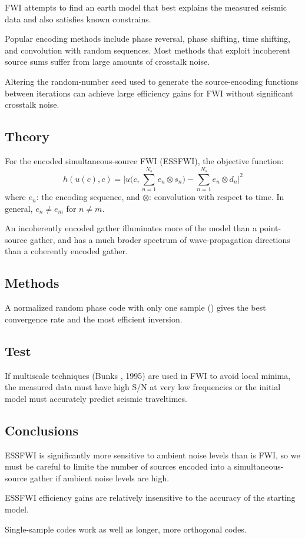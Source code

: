 FWI attempts to find an earth model that best explains
the measured seismic data and also satisfies known constrains.

Popular encoding methods include phase reversal, phase shifting, time shifting,
and convolution with random sequences.
Most methods that exploit incoherent source sums suffer from
large amounts of crosstalk noise.

Altering the random-number seed used to generate the source-encoding functions
between iterations can achieve large efficiency gains for FWI
without significant crosstalk noise.

\subsection{Theory}
For the encoded simultaneous-source FWI (ESSFWI),
the objective function:
\[ h(u(c),c) = \Bigg| u\Bigg(c,\sum_{n=1}^{N_s}e_n\otimes s_n\Bigg)
  - \sum_{n=1}^{N_s}e_n\otimes d_n\Bigg|^2 \]
where $e_n$: the encoding sequence,
and $\otimes$: convolution with respect to time.
In general, $e_n\neq e_m$ for $n\neq m$.

An incoherently encoded gather illuminates more of the model
than a point-source gather,
and has a much broder spectrum of wave-propagation directions
than a coherently encoded gather.

\subsection{Methods}
A normalized random phase code with only one sample
()
gives the best convergence rate and the most efficient inversion.

\subsection{Test}
If multiscale techniques (Bunks \etal, 1995) are used
in FWI to avoid local minima,
the measured data must have high S/N at very low frequencies or
the initial model must accurately predict seismic traveltimes.

\subsection{Conclusions}
ESSFWI is significantly more sensitive to ambient noise levels than is FWI,
so we must be careful to limite the number of sources encoded into
a simultaneous-source gather if ambient noise levels are high.

ESSFWI efficiency gains are relatively insensitive to
the accuracy of the starting model.

Single-sample codes work as well as longer, more orthogonal codes.

